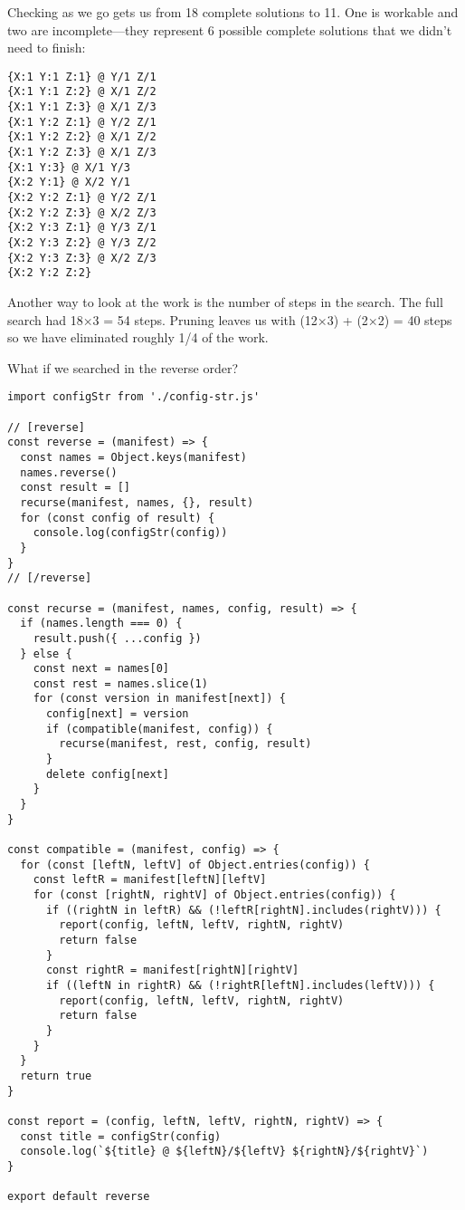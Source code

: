 \documentclass[krantzl]{krantz}
\begin{document}
Checking as we go gets us from 18 complete solutions to 11.
One is workable
and two are incomplete—they represent 6 possible complete solutions that we didn’t need to finish:


\begin{lstlisting}[frame=tblr,backgroundcolor=\color{black!5}]
{X:1 Y:1 Z:1} @ Y/1 Z/1
{X:1 Y:1 Z:2} @ X/1 Z/2
{X:1 Y:1 Z:3} @ X/1 Z/3
{X:1 Y:2 Z:1} @ Y/2 Z/1
{X:1 Y:2 Z:2} @ X/1 Z/2
{X:1 Y:2 Z:3} @ X/1 Z/3
{X:1 Y:3} @ X/1 Y/3
{X:2 Y:1} @ X/2 Y/1
{X:2 Y:2 Z:1} @ Y/2 Z/1
{X:2 Y:2 Z:3} @ X/2 Z/3
{X:2 Y:3 Z:1} @ Y/3 Z/1
{X:2 Y:3 Z:2} @ Y/3 Z/2
{X:2 Y:3 Z:3} @ X/2 Z/3
{X:2 Y:2 Z:2}
\end{lstlisting}



Another way to look at the work is the number of steps in the search.
The full search had 18×3 = 54 steps.
Pruning leaves us with (12×3) + (2×2) = 40 steps
so we have eliminated roughly 1/4 of the work.


What if we searched in the reverse order?


\begin{lstlisting}[frame=tblr]
import configStr from './config-str.js'

// [reverse]
const reverse = (manifest) => {
  const names = Object.keys(manifest)
  names.reverse()
  const result = []
  recurse(manifest, names, {}, result)
  for (const config of result) {
    console.log(configStr(config))
  }
}
// [/reverse]

const recurse = (manifest, names, config, result) => {
  if (names.length === 0) {
    result.push({ ...config })
  } else {
    const next = names[0]
    const rest = names.slice(1)
    for (const version in manifest[next]) {
      config[next] = version
      if (compatible(manifest, config)) {
        recurse(manifest, rest, config, result)
      }
      delete config[next]
    }
  }
}

const compatible = (manifest, config) => {
  for (const [leftN, leftV] of Object.entries(config)) {
    const leftR = manifest[leftN][leftV]
    for (const [rightN, rightV] of Object.entries(config)) {
      if ((rightN in leftR) && (!leftR[rightN].includes(rightV))) {
        report(config, leftN, leftV, rightN, rightV)
        return false
      }
      const rightR = manifest[rightN][rightV]
      if ((leftN in rightR) && (!rightR[leftN].includes(leftV))) {
        report(config, leftN, leftV, rightN, rightV)
        return false
      }
    }
  }
  return true
}

const report = (config, leftN, leftV, rightN, rightV) => {
  const title = configStr(config)
  console.log(`${title} @ ${leftN}/${leftV} ${rightN}/${rightV}`)
}

export default reverse
\end{lstlisting}
\end{document}
